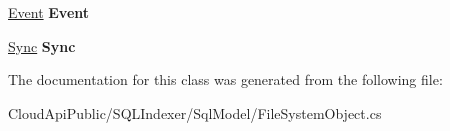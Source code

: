\begin{DoxyCompactItemize}
\item 
\hypertarget{class_s_q_l_indexer_1_1_sql_model_1_1_file_system_object_ad8fa1c71d20ffc968ef987fae8418d40}{\hyperlink{class_s_q_l_indexer_1_1_sql_model_1_1_event}{Event} {\bfseries Event}}\label{class_s_q_l_indexer_1_1_sql_model_1_1_file_system_object_ad8fa1c71d20ffc968ef987fae8418d40}

\item 
\hypertarget{class_s_q_l_indexer_1_1_sql_model_1_1_file_system_object_ae4e4c1c4d8f3360fc81ee8b3569f8be0}{\hyperlink{class_s_q_l_indexer_1_1_sql_model_1_1_sync}{Sync} {\bfseries Sync}}\label{class_s_q_l_indexer_1_1_sql_model_1_1_file_system_object_ae4e4c1c4d8f3360fc81ee8b3569f8be0}

\end{DoxyCompactItemize}


The documentation for this class was generated from the following file\-:\begin{DoxyCompactItemize}
\item 
Cloud\-Api\-Public/\-S\-Q\-L\-Indexer/\-Sql\-Model/File\-System\-Object.\-cs\end{DoxyCompactItemize}
